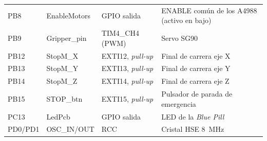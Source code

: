 \begin{table}[H]
\begin{tabular}{@{}llll@{}}
PB8  & EnableMotors & GPIO salida & ENABLE común de los A4988 (activo en bajo)\\
PB9  & Gripper\_pin & TIM4\_CH4 (PWM) & Servo SG90\\
PB12 & StopM\_X   & EXTI12, \emph{pull-up} & Final de carrera eje X\\
PB13 & StopM\_Y   & EXTI13, \emph{pull-up} & Final de carrera eje Y\\
PB14 & StopM\_Z   & EXTI14, \emph{pull-up} & Final de carrera eje Z\\
PB15 & STOP\_btn  & EXTI15, \emph{pull-up} & Pulsador de parada de emergencia\\
PC13 & LedPcb     & GPIO salida & LED de la \emph{Blue Pill}\\
PD0/PD1 & OSC\_IN/OUT & RCC     & Cristal HSE \SI{8}{\mega\hertz}\\
\bottomrule
\end{tabular}
\end{table}
